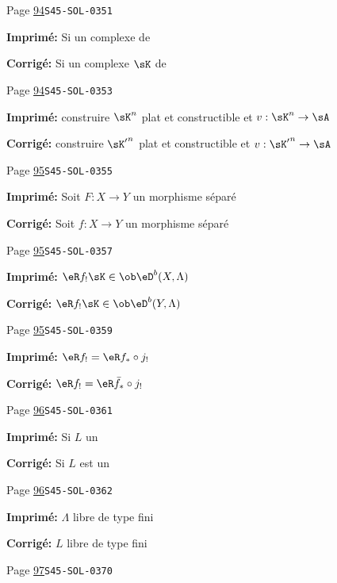 \begin{description}
\smallskip
\item[\hypertarget{apparatus:FR-0045}{45}] Page \hyperlink{printpage:fr:94}{94}\quad\texttt{S45-SOL-0351}
\par\noindent\textbf{Imprimé:} Si un complexe de
\par\noindent\textbf{Corrigé:} Si un complexe $\sK$ de
\smallskip
\item[\hypertarget{apparatus:FR-0046}{46}] Page \hyperlink{printpage:fr:94}{94}\quad\texttt{S45-SOL-0353}
\par\noindent\textbf{Imprimé:} construire $\sK^n$ plat et constructible et $v:\sK^n\to \sA$
\par\noindent\textbf{Corrigé:} construire ${\sK'}^n$ plat et constructible et $v:{\sK'}^n\to \sA$
\smallskip
\item[\hypertarget{apparatus:FR-0047}{47}] Page \hyperlink{printpage:fr:95}{95}\quad\texttt{S45-SOL-0355}
\par\noindent\textbf{Imprimé:} Soit $F:X\to Y$ un morphisme séparé
\par\noindent\textbf{Corrigé:} Soit $f:X\to Y$ un morphisme séparé
\smallskip
\item[\hypertarget{apparatus:FR-0048}{48}] Page \hyperlink{printpage:fr:95}{95}\quad\texttt{S45-SOL-0357}
\par\noindent\textbf{Imprimé:} $\eR f_!\sK\in \ob \eD^b(X,\Lambda)$
\par\noindent\textbf{Corrigé:} $\eR f_!\sK\in \ob \eD^b(Y,\Lambda)$
\smallskip
\item[\hypertarget{apparatus:FR-0049}{49}] Page \hyperlink{printpage:fr:95}{95}\quad\texttt{S45-SOL-0359}
\par\noindent\textbf{Imprimé:} $\eR f_! = \eR f_*\circ j_!$
\par\noindent\textbf{Corrigé:} $\eR f_! = \eR \bar f_*\circ j_!$
\smallskip
\item[\hypertarget{apparatus:FR-0050}{50}] Page \hyperlink{printpage:fr:96}{96}\quad\texttt{S45-SOL-0361}
\par\noindent\textbf{Imprimé:} Si $L$ un
\par\noindent\textbf{Corrigé:} Si $L$ est un
\smallskip
\item[\hypertarget{apparatus:FR-0051}{51}] Page \hyperlink{printpage:fr:96}{96}\quad\texttt{S45-SOL-0362}
\par\noindent\textbf{Imprimé:} $\Lambda$ libre de type fini
\par\noindent\textbf{Corrigé:} $L$ libre de type fini
\smallskip
\item[\hypertarget{apparatus:FR-0052}{52}] Page \hyperlink{printpage:fr:97}{97}\quad\texttt{S45-SOL-0370}

\end{description}
